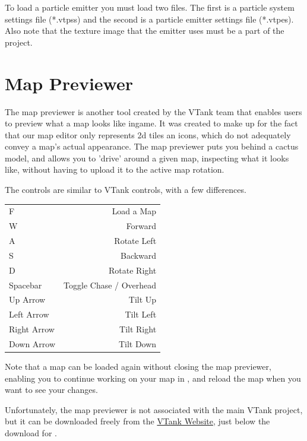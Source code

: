 To load a particle emitter you must load two files. The first is a particle system settings file (*.vtpss) and the second is a particle emitter settings file (*.vtpes). Also note that the texture image that the emitter uses must be a part of the project.  

\section{Map Previewer}

The map previewer is another tool created by the VTank team that enables users to preview what a map looks like ingame.  It was created to make up for the fact that our map editor only represents 2d tiles an icons, which do not adequately convey a map's actual appearance.  The map previewer puts you behind a cactus model, and allows you to 'drive' around a given map, inspecting what it looks like, without having to upload it to the active map rotation.

The controls are similar to VTank controls, with a few differences.

\begin{table}[h]
	\centering
		\begin{tabular} {l | r}
		F & Load a Map \\
		W & Forward \\
		A & Rotate Left \\
		S & Backward \\
		D & Rotate Right \\
		Spacebar & Toggle Chase / Overhead \\
		Up Arrow & Tilt Up \\
		Left Arrow & Tilt Left \\
		Right Arrow & Tilt Right \\
		Down Arrow & Tilt Down \\			
		\end{tabular}
\end{table}

Note that a map can be loaded again without closing the map previewer, enabling you to continue working on your map in \MapEditor, and reload the map when you want to see your changes.

Unfortunately, the map previewer is not associated with the main VTank project, but it can be downloaded freely from the \href{http://vtank.cis.vtc.edu/downloads}{VTank Website}, just below the download for \MapEditor.